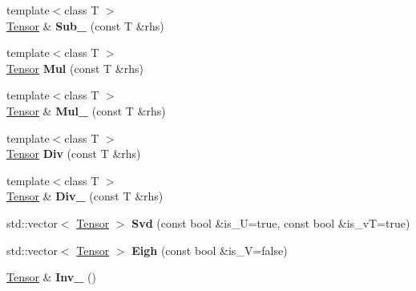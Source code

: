 \begin{DoxyCompactItemize}
\item 
\mbox{\label{classcytnx_1_1Tensor_a3482ddb0ebd4ae6585dcea7c96702e0c}} 
{\footnotesize template$<$class T $>$ }\\\hyperlink{classcytnx_1_1Tensor}{Tensor} \& {\bfseries Sub\+\_\+} (const T \&rhs)
\item 
\mbox{\label{classcytnx_1_1Tensor_a443885c8f02ab5352d81255e4650cf32}} 
{\footnotesize template$<$class T $>$ }\\\hyperlink{classcytnx_1_1Tensor}{Tensor} {\bfseries Mul} (const T \&rhs)
\item 
\mbox{\label{classcytnx_1_1Tensor_a92461c94266f7185da6f8fd35d1ffee4}} 
{\footnotesize template$<$class T $>$ }\\\hyperlink{classcytnx_1_1Tensor}{Tensor} \& {\bfseries Mul\+\_\+} (const T \&rhs)
\item 
\mbox{\label{classcytnx_1_1Tensor_add04fc004ccab102743f3e392f6bb482}} 
{\footnotesize template$<$class T $>$ }\\\hyperlink{classcytnx_1_1Tensor}{Tensor} {\bfseries Div} (const T \&rhs)
\item 
\mbox{\label{classcytnx_1_1Tensor_a030748d3e2003f655b1cf73fe0d55a63}} 
{\footnotesize template$<$class T $>$ }\\\hyperlink{classcytnx_1_1Tensor}{Tensor} \& {\bfseries Div\+\_\+} (const T \&rhs)
\item 
\mbox{\label{classcytnx_1_1Tensor_a0dc4a19c04d3576c3364deb74251d855}} 
std\+::vector$<$ \hyperlink{classcytnx_1_1Tensor}{Tensor} $>$ {\bfseries Svd} (const bool \&is\+\_\+U=true, const bool \&is\+\_\+vT=true)
\item 
\mbox{\label{classcytnx_1_1Tensor_ac456006e0fbd6108dddc520e4ad12ff7}} 
std\+::vector$<$ \hyperlink{classcytnx_1_1Tensor}{Tensor} $>$ {\bfseries Eigh} (const bool \&is\+\_\+V=false)
\item 
\mbox{\label{classcytnx_1_1Tensor_ad21dcb7ba06d23c78ee5fd4e9266a462}} 
\hyperlink{classcytnx_1_1Tensor}{Tensor} \& {\bfseries Inv\+\_\+} ()

\end{DoxyCompactItemize}
